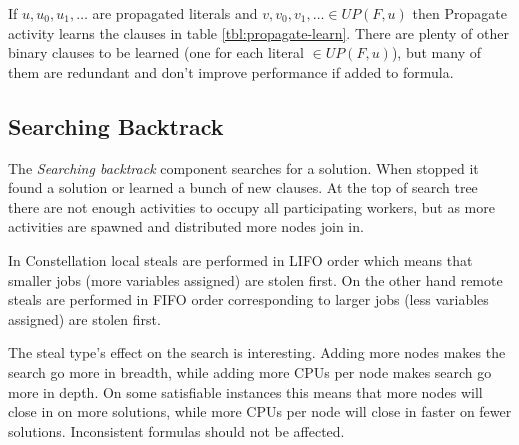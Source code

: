 If $u, u_0, u_1, \ldots$ are propagated literals and $v, v_0, v_1,
\ldots \in UP(F, u)$ then Propagate activity learns the clauses in table
\ref{tbl:propagate-learn}. There are plenty of other binary clauses
to be learned (one for each literal $\in UP(F, u)$), but many of them
are redundant and don't improve performance if added to formula.

\begin{table}
  \centering
  \caption{Learned units and binaries by Propagate activity}
  \label{tbl:propagate-learn}
\end{table}



\subsection{Searching Backtrack}
\label{ssec:searching-tree}

The \emph{Searching backtrack} component searches for a solution.
When stopped it found a solution or learned a bunch of new clauses.
At the top of search tree there are not enough activities to occupy
all participating workers, but as more activities are spawned and
distributed more nodes join in.

In Constellation local steals are performed in LIFO order which means
that smaller jobs (more variables assigned) are stolen first. On
the other hand remote steals are performed in FIFO order corresponding
to larger jobs (less variables assigned) are stolen first.

The steal type's effect on the search is interesting. Adding
more nodes makes the search go more in breadth, while adding more
CPUs per node makes search go more in depth. On some satisfiable
instances this means that more nodes will close in on more solutions,
while more CPUs per node will close in faster on fewer solutions.
Inconsistent formulas should not be affected.

